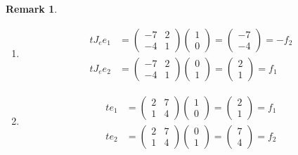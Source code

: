 \documentclass[aps,preprint]{revtex4}
\newtheorem{remark}[theorem]{Remark}
\begin{document}
\begin{remark}
\begin{enumerate}
\item 
\begin{align}
tJ_{e}e_{1}& =\left( 
\begin{array}{cc}
-7 & 2 \\ 
-4 & 1%
\end{array}%
\right) \left( 
\begin{array}{c}
1 \\ 
0%
\end{array}%
\right) =\left( 
\begin{array}{c}
-7 \\ 
-4%
\end{array}%
\right) =-f_{2} \\
tJ_{e}e_{2}& =\left( 
\begin{array}{cc}
-7 & 2 \\ 
-4 & 1%
\end{array}%
\right) \left( 
\begin{array}{c}
0 \\ 
1%
\end{array}%
\right) =\left( 
\begin{array}{c}
2 \\ 
1%
\end{array}%
\right) =f_{1}
\end{align}

\item 
\begin{align}
te_{1}& =\left( 
\begin{array}{cc}
2 & 7 \\ 
1 & 4%
\end{array}%
\right) \left( 
\begin{array}{c}
1 \\ 
0%
\end{array}%
\right) =\left( 
\begin{array}{c}
2 \\ 
1%
\end{array}%
\right) =f_{1} \\
te_{2}& =\left( 
\begin{array}{cc}
2 & 7 \\ 
1 & 4%
\end{array}%
\right) \left( 
\begin{array}{c}
0 \\ 
1%
\end{array}%
\right) =\left( 
\begin{array}{c}
7 \\ 
4%
\end{array}%
\right) =f_{2}
\end{align}


\end{enumerate}
\end{remark}
\end{document}
